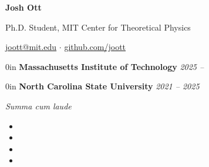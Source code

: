 \documentclass{cv}
\begin{document}
\begin{center}
    {\textbf{\LARGE Josh Ott}\par}

    \vspace{0.2em}

    Ph.D. Student, MIT Center for Theoretical Physics

    \href{mailto:joott@mit.edu}{joott@mit.edu} $\cdot$
    \href{https://www.github.com/joott}{github.com/joott}\\
\end{center}
\vspace{-0.6em}


\begin{adjustwidth}{\spacing}{0in}
    \textbf{Massachusetts Institute of Technology} \hfill \textsl{2025 --}

\end{adjustwidth}

\begin{adjustwidth}{\spacing}{0in}
    \textbf{North Carolina State University} \hfill \textsl{2021 -- 2025}


    \tabto{\bullet} \textit{Summa cum laude}
\end{adjustwidth}


\vspace{-0.6em}

\begin{itemize}[leftmargin=1.3em]
    \setlength\itemsep{-0.1em}
    \item {}
    \item {}
    \item {}
    \item {}
\end{itemize}
\vspace{-0.3em}



\vspace{0.3em}

\end{document}
